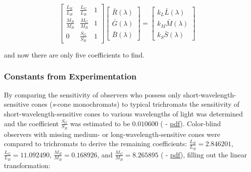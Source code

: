 \documentclass{article}
\begin{document}
\begin{multicols}{2}
\begin{equation}\label{eq:cone_fundamental_linear_transformation_symbolic_simplified} %
    \begin{bmatrix}
        \frac{L_R}{L_B}&\frac{L_G}{L_B}&1\\
        \frac{M_R}{M_B}&\frac{M_G}{M_B}&1\\
        0&\frac{S_G}{S_B}&1
    \end{bmatrix}\begin{bmatrix}
        \bar{R}(\lambda)\\
        \bar{G}(\lambda)\\
        \bar{B}(\lambda)
    \end{bmatrix}=\begin{bmatrix}
        k_L\bar{L}(\lambda)\\
        k_M\bar{M}(\lambda)\\
        k_S\bar{S}(\lambda)
    \end{bmatrix}
\end{equation}

and now there are only five coefficients to find.

\subsubsection{Constants from Experimentation} %

By comparing the sensitivity of observers who possess only short-wavelength-sensitive cones (\textit{s}-cone monochromats) to typical trichromats the sensitivity of short-wavelength-sensitive cones to various wavelengths of light was determined and the coefficient $\frac{S_G}{S_B}$ was estimated to be $0.010600$ (\cite{stockman1999spectral} - \href{https://www.sciencedirect.com/science/article/pii/S0042698998002259}{pdf}).  Color-blind observers with missing medium- or long-wavelength-sensitive cones were compared to trichromats to derive the remaining coefficients: $\frac{L_R}{L_B}=2.846201$, $\frac{L_G}{L_B}=11.092490$, $\frac{M_R}{M_B}=0.168926$, and $\frac{M_G}{M_B}=8.265895$ (\cite{stockman2000spectral} - \href{https://www.sciencedirect.com/science/article/pii/S0042698900000213}{pdf}), filling out the linear transformation:


\end{multicols}
\end{document}
